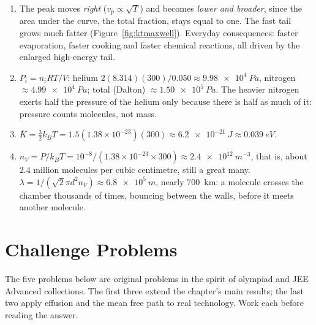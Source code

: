 {\begin{enumerate}[itemsep=2pt]
      $C_v = 3R$ and $\gamma = 1+\tfrac26 = \tfrac43 \approx 1.33$. A linear molecule has no rotation about
      its own axis that can take up energy, so it has one rotational degree of freedom fewer than a bent
      one, and a larger $\gamma$. (Real CO$_2$ already has partly excited vibrations at room temperature,
      so its measured $\gamma$ is about 1.29.)
\item The peak moves \emph{right} ($v_p\propto\sqrt T$) and becomes \emph{lower and broader}, since the
      area under the curve, the total fraction, stays equal to one. The fast tail grows much fatter
      (Figure~\ref{fig:ktmaxwell}). Everyday consequences: faster evaporation, faster cooking and faster
      chemical reactions, all driven by the enlarged high-energy tail.
\item $P_i=n_iRT/V$: helium $2(8.314)(300)/0.050\approx\SI{9.98e4}{Pa}$, nitrogen
      $\approx\SI{4.99e4}{Pa}$; total (Dalton) $\approx\SI{1.50e5}{Pa}$. The heavier nitrogen exerts
      half the pressure of the helium only because there is half as much of it: pressure counts molecules,
      not mass.
\item $\overline K=\tfrac32k_BT=1.5(1.38\times10^{-23})(300)\approx\SI{6.2e-21}{J}\approx\SI{0.039}{eV}$.
\item $n_V=P/k_BT=10^{-8}/(1.38\times10^{-23}\times300)\approx\SI{2.4e12}{m^{-3}}$, that is,
      about $2.4$ million molecules per cubic centimetre, still a great many.
      $\lambda=1/(\sqrt2\pi d^2n_V)\approx\SI{6.8e5}{m}$, nearly \SI{700}{km}: a molecule crosses the
      chamber thousands of times, bouncing between the walls, before it meets another molecule.
\end{enumerate}

}

\section{Challenge Problems}\label{sec:ktchallenge}

The five problems below are original problems in the spirit of olympiad and JEE Advanced collections.
The first three extend the chapter's main results; the last two apply effusion and the mean free path to
real technology. Work each before reading the answer.

